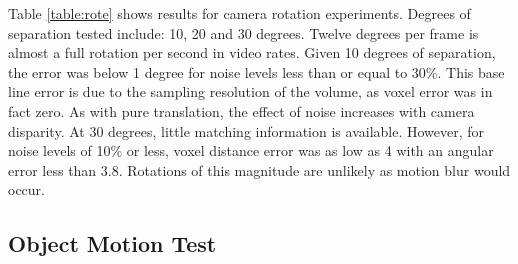 Table \ref{table:rote} shows results for camera rotation experiments. Degrees of separation tested include: 10, 20 and 30 degrees. Twelve degrees per frame is almost a full rotation per second in video rates. Given 10 degrees of separation, the error was below 1 degree for noise levels less than or equal to 30\%. This base line error is due to the sampling resolution of the volume, as voxel error was in fact zero. As with pure translation, the effect of noise increases with camera disparity. At 30 degrees, little matching information is available. However, for noise levels of 10\% or less, voxel distance error was as low as 4 with an angular error less than $3.8$. Rotations of this magnitude are unlikely as motion blur would occur.



\begin{table}[ht]
\parbox{.45\linewidth}{
\centering
{}
\caption{Rotation Tracking}
\label{table:rote}
}

\subsection{Object Motion Test}


\end{table}
